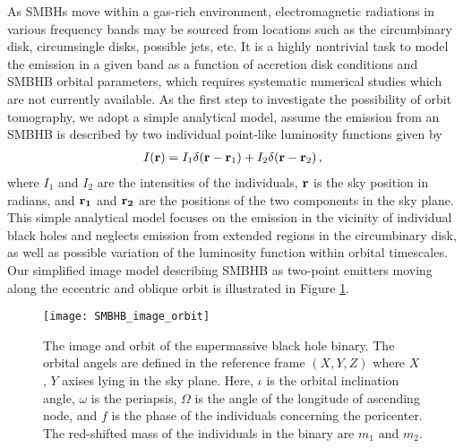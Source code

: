 \documentclass[twocolumn]{aastex62}
\def\m{\begin{eqnarray}}
\def\n{\end{eqnarray}}
\begin{document}
As SMBHs move within a gas-rich environment, electromagnetic radiations in various frequency bands may be sourced from locations  such as the circumbinary disk, circumsingle disks, possible jets, etc. It is a highly nontrivial task to model the emission in a given band as a function of accretion disk conditions and SMBHB orbital parameters, which requires  systematic numerical studies which are not currently available. As the first step to investigate the possibility of orbit tomography, 
 we adopt a simple analytical model, assume the emission from an SMBHB is described by two individual point-like luminosity functions given by 
\m \label{def_intensity}
I({\bf r})={I}_1 \delta ({{\bf r}}-{ {{\bf r}}_1}) +{I}_2 \delta ({{\bf r}} -{{{\bf r}}_2})\,,
\n 
where $I_1$ and $I_2$ are the intensities of the individuals, ${\bf r}$ is the sky position in radians, and ${\bf r_1}$ and ${\bf r_2}$ are the positions of the two components in the sky plane. This simple analytical model focuses on the emission in the vicinity of individual black holes and neglects emission from extended regions in the circumbinary disk, as well as possible variation of the luminosity function within orbital timescales. Our simplified image model describing SMBHB as two-point emitters moving along the eccentric and oblique orbit is illustrated in Figure \ref{BBH_image}. 
%
\begin{figure}[h] %
\centering
\texttt{[image: SMBHB\_image\_orbit]}
\caption{The image and orbit of the supermassive black hole binary. The orbital angels are defined in the reference frame $(X, Y, Z)$ where $X$, $Y$ axises lying in the sky plane. Here, $\iota$ is the orbital inclination angle, $\omega$ is the periapsis, $\Omega$ is the angle of the longitude of ascending node, and $f$ is the phase of the individuals concerning the pericenter. The red-shifted mass of the individuals in the binary are $m_1$ and $m_2$.  }
\label{BBH_image}
\end{figure}
\end{document}
